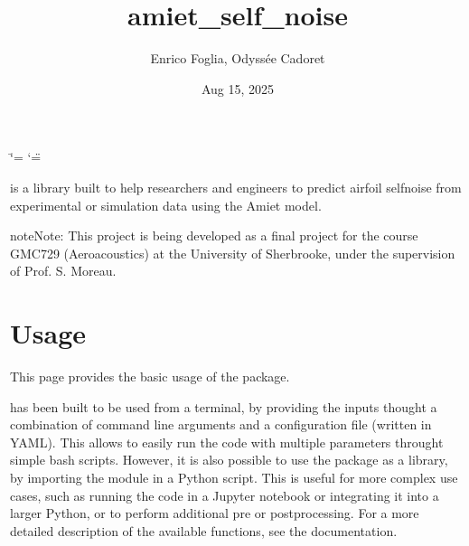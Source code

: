 \documentclass[letterpaper,10pt,english]{sphinxmanual}
\title{amiet\_self\_noise}
\date{Aug 15, 2025}
\author{Enrico Foglia, Odyssée Cadoret}
\begin{document}
\ifdefined\shorthandoff
  \ifnum\catcode`\=\string=\active\shorthandoff{=}\fi
  \ifnum\catcode`\"=\active{}\fi
\fi

\pagestyle{empty}
\sphinxmaketitle
\pagestyle{plain}
\sphinxtableofcontents
\pagestyle{normal}
\label{\detokenize{index::doc}}


\sphinxAtStartPar
{} is a library built to help researchers and engineers to predict airfoil self\sphinxhyphen{}noise from experimental or simulation data using the Amiet model.

\begin{sphinxadmonition}{note}{Note:}
\sphinxAtStartPar
This project is being developed as a final project for the course GMC729 (Aeroacoustics) at the University of Sherbrooke, under the supervision of Prof. S. Moreau.
\end{sphinxadmonition}

\sphinxstepscope


\chapter{Usage}
\label{\detokenize{usage:usage}}\label{\detokenize{usage::doc}}
\sphinxAtStartPar
This page provides the basic usage of the  package.

\sphinxAtStartPar
{} has been built to be used from a terminal, by providing the inputs thought a combination of command line arguments and a configuration file (written in YAML). This allows to easily run the code with multiple parameters throught simple bash scripts. However, it is also possible to use the package as a library, by importing the  module in a Python script. This is useful for more complex use cases, such as running the code in a Jupyter notebook or integrating it into a larger Python, or to perform additional pre or postprocessing. For a more detailed description of the available functions, see the  {\hyperref[\detokenize{modules::doc}]{}} documentation.
\end{document}
